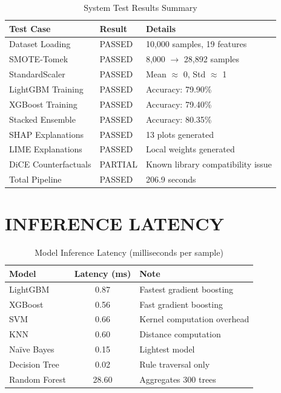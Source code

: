 \documentclass[12pt,a4paper,oneside]{report}
\begin{document}
\begin{table}[H]
\centering
\caption{System Test Results Summary}
\label{tab:systemtest}
\renewcommand{\arraystretch}{1.3}
\begin{tabular}{p{4cm} p{2.5cm} p{6cm}}
\toprule
\textbf{Test Case} & \textbf{Result} & \textbf{Details} \\
\midrule
Dataset Loading    & PASSED & 10,000 samples, 19 features \\
SMOTE-Tomek        & PASSED & 8,000 $\rightarrow$ 28,892 samples \\
StandardScaler     & PASSED & Mean $\approx$ 0, Std $\approx$ 1 \\
LightGBM Training  & PASSED & Accuracy: 79.90\% \\
XGBoost Training   & PASSED & Accuracy: 79.40\% \\
Stacked Ensemble   & PASSED & Accuracy: 80.35\% \\
SHAP Explanations  & PASSED & 13 plots generated \\
LIME Explanations  & PASSED & Local weights generated \\
DiCE Counterfactuals & PARTIAL & Known library compatibility issue \\
Total Pipeline     & PASSED & 206.9 seconds \\
\bottomrule
\end{tabular}
\end{table}

\section{INFERENCE LATENCY}

\begin{table}[H]
\centering
\caption{Model Inference Latency (milliseconds per sample)}
\label{tab:latency}
\renewcommand{\arraystretch}{1.3}
\begin{tabular}{p{4cm} c p{5cm}}
\toprule
\textbf{Model} & \textbf{Latency (ms)} & \textbf{Note} \\
\midrule
LightGBM    & 0.87  & Fastest gradient boosting \\
XGBoost     & 0.56  & Fast gradient boosting \\
SVM         & 0.66  & Kernel computation overhead \\
KNN         & 0.60  & Distance computation \\
Na\"{i}ve Bayes & 0.15 & Lightest model \\
Decision Tree & 0.02 & Rule traversal only \\
Random Forest & 28.60 & Aggregates 300 trees \\
\bottomrule
\end{tabular}
\end{table}
\end{document}
